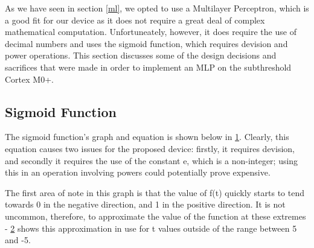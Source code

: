 
As we have seen in section \ref{ml}, we opted to use a Multilayer Perceptron, which is a good fit for our device as it does not require a great deal of complex mathematical computation. Unfortuneately, however, it does require the use of decimal numbers and uses the sigmoid function, which requires devision and power operations. This section discusses some of the design decisions and sacrifices that were made in order to implement an MLP on the subthreshold Cortex M0+.

\subsection{Sigmoid Function}
The sigmoid function's graph and equation is shown below in \ref{fig:sigmoid}. Clearly, this equation causes two issues for the proposed device: firstly, it requires devision, and secondly it requires the use of the constant e, which is a non-integer; using this in an operation involving powers could potentially prove expensive.

The first area of note in this graph is that the value of f(t) quickly starts to tend towards 0 in the negative direction, and 1 in the positive direction. It is not uncommon, therefore, to approximate the value of the function at these extremes - \ref{fig:sigmoid_ends} shows this approximation in use for t values outside of the range between 5 and -5.

\begin{figure}[h]
\centering
{}
\label{fig:sigmoid}
\end{figure}

\begin{figure}[h]
\centering
{}
\label{fig:sigmoid_ends}
\end{figure}





